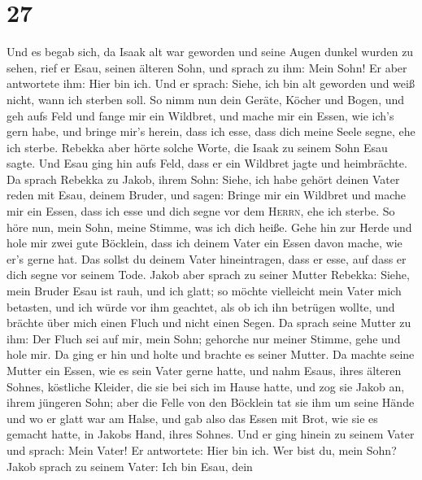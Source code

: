\hypertarget{section-26}{%
\section{27}\label{section-26}}

 Und es begab sich, da Isaak alt war geworden und seine
Augen dunkel wurden zu sehen, rief er Esau, seinen älteren Sohn, und
sprach zu ihm: Mein Sohn! Er aber antwortete ihm: Hier bin ich.
 Und er sprach: Siehe, ich bin alt geworden und weiß
nicht, wann ich sterben soll.  So nimm nun dein Geräte,
Köcher und Bogen, und geh aufs Feld und fange mir ein Wildbret,
 und mache mir ein Essen, wie ich's gern habe, und bringe
mir's herein, dass ich esse, dass dich meine Seele segne, ehe ich
sterbe.  Rebekka aber hörte solche Worte, die Isaak zu
seinem Sohn Esau sagte. Und Esau ging hin aufs Feld, dass er ein
Wildbret jagte und heimbrächte.  Da sprach Rebekka zu
Jakob, ihrem Sohn: Siehe, ich habe gehört deinen Vater reden mit Esau,
deinem Bruder, und sagen:  Bringe mir ein Wildbret und
mache mir ein Essen, dass ich esse und dich segne vor dem
\textsc{Herrn}, ehe ich sterbe.  So höre nun, mein Sohn,
meine Stimme, was ich dich heiße.  Gehe hin zur Herde und
hole mir zwei gute Böcklein, dass ich deinem Vater ein Essen davon
mache, wie er's gerne hat.  Das sollst du deinem Vater
hineintragen, dass er esse, auf dass er dich segne vor seinem Tode.
 Jakob aber sprach zu seiner Mutter Rebekka: Siehe, mein
Bruder Esau ist rauh, und ich glatt;  so möchte
vielleicht mein Vater mich betasten, und ich würde vor ihm geachtet, als
ob ich ihn betrügen wollte, und brächte über mich einen Fluch und nicht
einen Segen.  Da sprach seine Mutter zu ihm: Der Fluch
sei auf mir, mein Sohn; gehorche nur meiner Stimme, gehe und hole mir.
 Da ging er hin und holte und brachte es seiner Mutter.
Da machte seine Mutter ein Essen, wie es sein Vater gerne hatte,
 und nahm Esaus, ihres älteren Sohnes, köstliche Kleider,
die sie bei sich im Hause hatte, und zog sie Jakob an, ihrem jüngeren
Sohn;  aber die Felle von den Böcklein tat sie ihm um
seine Hände und wo er glatt war am Halse,  und gab also
das Essen mit Brot, wie sie es gemacht hatte, in Jakobs Hand, ihres
Sohnes.  Und er ging hinein zu seinem Vater und sprach:
Mein Vater! Er antwortete: Hier bin ich. Wer bist du, mein Sohn?
 Jakob sprach zu seinem Vater: Ich bin Esau, dein
